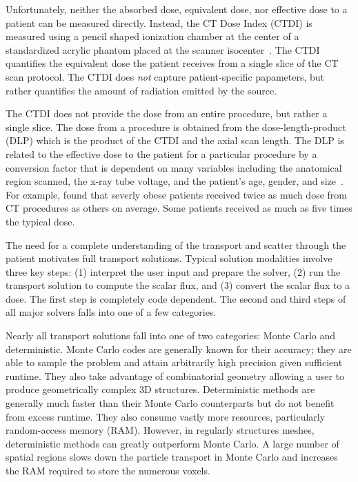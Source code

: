 Unfortunately, neither the absorbed dose, equivalent dose, nor effective dose to a patient can be measured directly. Instead, the CT Dose Index (CTDI) is measured using a pencil shaped ionization chamber at the center of  a standardized acrylic phantom placed at the scanner isocenter~\citep{ref:hudaw}. The CTDI quantifies the equivalent dose the patient receives from a single slice of the CT scan protocol. The CTDI does \textit{not} capture patient-specific papameters, but rather quantifies the amount of radiation emitted by the source.

The CTDI does not provide the dose from an entire procedure, but rather a single slice. The dose from a procedure is obtained from the dose-length-product (DLP) which is the product of the CTDI and the axial scan length. The DLP is related to the effective dose to the patient for a particular procedure by a conversion factor that is dependent on many variables including the anatomical region scanned, the x-ray tube voltage, and the patient's age, gender, and size~\citep{ref:hudaw}. For example, \citet{ref:lauk} found that severly obese patients received twice as much dose from CT procedures as others on average. Some patients received as much as five times the typical dose.

The need for a complete understanding of the transport and scatter through the patient motivates full transport solutions. Typical solution modalities involve three key steps: (1) interpret the user input and prepare the solver, (2) run the transport solution to compute the scalar flux, and (3) convert the scalar flux to a dose. The first step is completely code dependent. The second and third steps of all major solvers falls into one of a few categories.

Nearly all transport solutions fall into one of two categories: Monte Carlo and deterministic. Monte Carlo codes are generally known for their accuracy; they are able to sample the problem and attain arbitrarily high precision given sufficient runtime. They also take advantage of combinatorial geometry allowing a user to produce geometrically complex 3D structures. Deterministic methods are generally much faster than their Monte Carlo counterparts but do not benefit from excess runtime. They also consume vastly more resources, particularly random-access memory (RAM). However, in regularly structures meshes, deterministic methods can greatly outperform Monte Carlo. A large number of spatial regions slows down the particle transport in Monte Carlo and increases the RAM required to store the numerous voxels.


